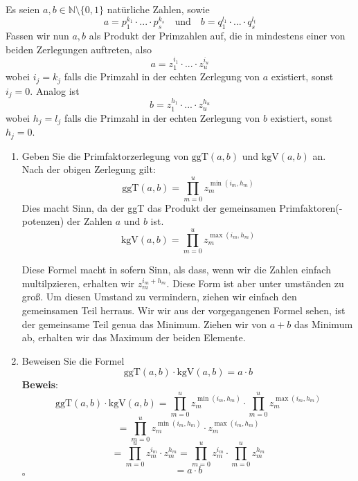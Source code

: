 \documentclass[11pt,a4paper,ngerman]{article}
\newcommand{\N}{\mathbb{N}}
\newcommand{\ggT}{\text{ggT}}
\newcommand{\kgV}{\text{kgV}}
\begin{document}
Es seien $a,b \in \N \setminus \{ 0,1 \}$ natürliche Zahlen, sowie
$$
a= p_1^{k_1}\cdot ...\cdot p_s^{k_s} \quad \text{und} \quad b = q_1^{l_1} \cdot ... \cdot q_s^{l_t}
$$
Fassen wir nun $a, b$ als Produkt der Primzahlen auf, die in mindestens einer von beiden Zerlegungen auftreten, also
$$ a= z_1^{i_1}\cdot ...\cdot z_u^{i_u} $$
wobei $i_j = k_j $ falls die Primzahl in der echten Zerlegung von $a$ existiert, sonst $i_j = 0$. Analog ist
$$ b = z_1^{h_1}\cdot ...\cdot z_u^{h_u} $$
wobei $h_j = l_j $ falls die Primzahl in der echten Zerlegung von $b$ existiert, sonst $h_j = 0$.
\begin{enumerate}[\bfseries a)]
\item Geben Sie die Primfaktorzerlegung von $\ggT (a,b)$ und $\kgV (a,b)$ an.\\
Nach der obigen Zerlegung gilt:
$$ \ggT(a,b) = \prod_{m=0}^{u} z_m^{\min{(i_m,h_m)}}$$
Dies macht Sinn, da der ggT das Produkt der gemeinsamen Primfaktoren(-potenzen) der Zahlen $a$ und $b$ ist. \\


$$ \kgV(a,b) = \prod_{m=0}^{u} z_m^{\max{(i_m,h_m)}}$$

Diese Formel macht in sofern Sinn, als dass, wenn wir die Zahlen einfach multilpzieren, erhalten wir $z_m^{i_m + h_m}$. Diese Form ist aber unter umständen zu groß. Um diesen Umstand zu vermindern, ziehen wir einfach den gemeinsamen Teil herraus. Wir wir aus der vorgegangenen Formel sehen, ist der gemeinsame Teil genua das Minimum. Ziehen wir von $a+ b$ das Minimum ab, erhalten wir das Maximum der beiden Elemente.

\item Beweisen Sie die Formel
$$ \ggT (a,b) \cdot \kgV (a,b) = a \cdot b $$
\textbf{Beweis}: \\
$$ \ggT (a,b) \cdot \kgV (a,b) = \prod_{m=0}^{u} z_m^{\min{(i_m,h_m)}} \cdot \prod_{m=0}^{u} z_m^{\max{(i_m,h_m)}} $$
$$ = \prod_{m=0}^{u} z_m^{\min{(i_m,h_m)}} \cdot z_m^{\max{(i_m,h_m)}} $$
$$ = \prod_{m=0}^{u} z_m^{i_m} \cdot z_m^{h_m} = \prod_{m=0}^{u} z_m^{i_m} \cdot \prod_{m=0}^{u} z_m^{h_m} $$
$$ = a \cdot b $$
\mbox{} \hfill $\square$
\end{enumerate}
\end{document}
